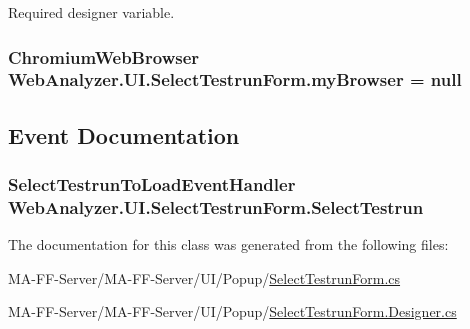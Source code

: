 Required designer variable. 

\hypertarget{class_web_analyzer_1_1_u_i_1_1_select_testrun_form_ac2ba9aef1d2ceece915af46662af8165}{}
\subsubsection[{my\+Browser}]{\setlength{\rightskip}{0pt plus 5cm}Chromium\+Web\+Browser Web\+Analyzer.\+U\+I.\+Select\+Testrun\+Form.\+my\+Browser = null\hspace{0.3cm}{\ttfamily [private]}}\label{class_web_analyzer_1_1_u_i_1_1_select_testrun_form_ac2ba9aef1d2ceece915af46662af8165}


\subsection{Event Documentation}
\hypertarget{class_web_analyzer_1_1_u_i_1_1_select_testrun_form_a21a81e06c20de7a18979a8c4c7ded945}{}
\subsubsection[{Select\+Testrun}]{\setlength{\rightskip}{0pt plus 5cm}Select\+Testrun\+To\+Load\+Event\+Handler Web\+Analyzer.\+U\+I.\+Select\+Testrun\+Form.\+Select\+Testrun}\label{class_web_analyzer_1_1_u_i_1_1_select_testrun_form_a21a81e06c20de7a18979a8c4c7ded945}


The documentation for this class was generated from the following files\+:\begin{DoxyCompactItemize}
\item 
M\+A-\/\+F\+F-\/\+Server/\+M\+A-\/\+F\+F-\/\+Server/\+U\+I/\+Popup/\hyperlink{_select_testrun_form_8cs}{Select\+Testrun\+Form.\+cs}\item 
M\+A-\/\+F\+F-\/\+Server/\+M\+A-\/\+F\+F-\/\+Server/\+U\+I/\+Popup/\hyperlink{_select_testrun_form_8_designer_8cs}{Select\+Testrun\+Form.\+Designer.\+cs}\end{DoxyCompactItemize}
